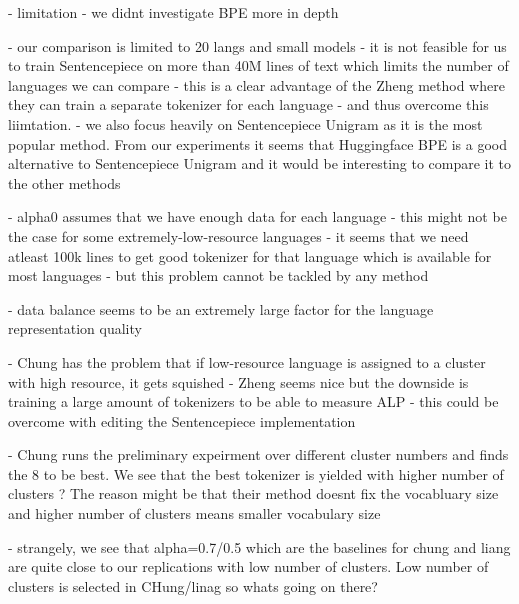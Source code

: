 - limitation - we didnt investigate BPE more in depth


- our comparison is limited to 20 langs and small models
    - it is not feasible for us to train Sentencepiece on more than 40M lines of text which limits the number of languages we can compare
    - this is a clear advantage of the Zheng method where they can train a separate tokenizer for each language - and thus overcome this liimtation.
- we also focus heavily on Sentencepiece Unigram as it is the most popular method. From our experiments it seems that Huggingface BPE is a good alternative to Sentencepiece Unigram and it would be interesting to compare it to the other methods

- alpha0 assumes that we have enough data for each language
    - this might not be the case for some extremely-low-resource languages
    - it seems that we need atleast 100k lines to get good tokenizer for that language which is available for most languages
    - but this problem cannot be tackled by any method

- data balance seems to be an extremely large factor for the language representation quality

- Chung has the problem that if low-resource language is assigned to a cluster with high resource, it gets squished
- Zheng seems nice but the downside is training a large amount of tokenizers to be able to measure ALP - this could be overcome with editing the Sentencepiece implementation

- Chung runs the preliminary expeirment over different cluster numbers and finds the 8 to be best. We see that the best tokenizer is yielded with higher number of clusters ? The reason might be that their method doesnt fix the vocabluary size and higher number of clusters means smaller vocabulary size

- strangely, we see that alpha=0.7/0.5 which are the baselines for chung and liang are quite close to our replications with low number of clusters. Low number of clusters is selected in CHung/linag so whats going on there?
